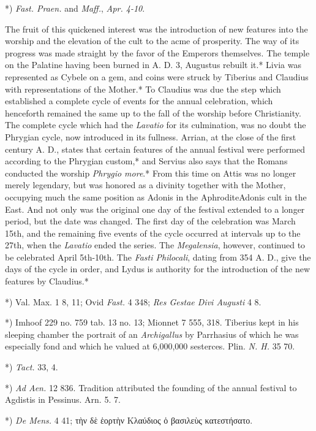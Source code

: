 \documentclass[a4paper, 11pt, oneside, polutonikogreek, english]{article}
\begin{document}
*) \emph{Fast. Praen.} and \emph{Maff.}, \emph{Apr. 4-10}.

The fruit of this quickened interest was the introduction of new features into the worship and the elevation of the cult to the acme of prosperity. The way of its progress was made straight by the favor of the Emperors themselves. The temple on the Palatine having been burned in A. D. 3, Augustus rebuilt it.* Livia was represented as Cybele on a gem, and coins were struck by Tiberius and Claudius with representations of the Mother.* To Claudius was due the step which established a complete cycle of events for the annual celebration, which henceforth remained the same up to the fall of the worship before Christianity. The complete cycle which had the \emph{Lavatio} for its culmination, was no doubt the Phrygian cycle, now introduced in its fullness. Arrian, at the close of the first century A. D., states that certain features of the annual festival were performed according to the Phrygian custom,* and Servius also says that the Romans conducted the worship \emph{Phrygio more}.* From this time on Attis was no longer merely legendary, but was honored as a divinity together with the Mother, occupying much the same position as Adonis in the AphroditeAdonis cult in the East. And not only was the original one day of the festival extended to a longer period, but the date was changed. The first day of the celebration was March 15th, and the remaining five events of the cycle occurred at intervals up to the 27th, when the \emph{Lavatio} ended the series. The \emph{Megalensia}, however, continued to be celebrated April 5th-10th. The \emph{Fasti Philocali}, dating from 354 A. D., give the days of the cycle in order, and Lydus is authority for the introduction of the new features by Claudius.*

*) Val. Max. 1 8, 11; Ovid \emph{Fast.} 4 348; \emph{Res Gestae Divi Augusti} 4 8.

*) Imhoof 229 no. 759 tab. 13 no. 13; Mionnet 7 555, 318. Tiberius kept in his sleeping chamber the portrait of an \emph{Archigallus} by Parrhasius of which he was especially fond and which he valued at 6,000,000 sesterces. Plin. \emph{N. H.} 35 70.

*) \emph{Tact.} 33, 4.

*) \emph{Ad Aen.} 12 836. Tradition attributed the founding of the annual festival to Agdistis in Pessinus. Arn. 5. 7.

*) \emph{De Mens.} 4 41; τὴν δὲ ἑορτὴν Κλαύδιος ὁ βασιλεὺς κατεστήσατο.
\end{document}
